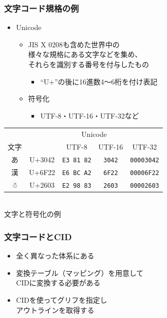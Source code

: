 \begin{frame}\frametitle{文字コード規格の例}
  \begin{itemize}
  \item Unicode
    \begin{itemize}
    \item JIS X 0208も含めた世界中の\\
      様々な規格にある文字などを集め、\\
      それらを識別する番号を付与したもの
      \begin{itemize}
      \item ``U+''の後に16進数4～6桁を付け表記
      \end{itemize}
    \item 符号化
      \begin{itemize}
        \item UTF-8・UTF-16・UTF-32など
      \end{itemize}
    \end{itemize}
  \end{itemize}

  \begin{center}
    \footnotesize
    \begin{tabular}{c|c|c|c|c}
      & \multicolumn{4}{c}{Unicode} \\
      \cline{3-5}
      文字 & & UTF-8 & UTF-16 & UTF-32 \\
      \hline
      あ & U+3042 & \texttt{E3 81 82} & \texttt{3042} & \texttt{00003042} \\
      漢 & U+6F22 & \texttt{E6 BC A2} & \texttt{6F22} & \texttt{00006F22} \\
      ☃ & U+2603 & \texttt{E2 98 83} & \texttt{2603} & \texttt{00002603}
    \end{tabular} \\
    文字と符号化の例
  \end{center}
\end{frame}

\begin{frame}\frametitle{文字コードとCID}
  \begin{itemize}
  \item 全く異なった体系にある
  \item 変換テーブル（マッピング）を用意して\\
    CIDに変換する必要がある
  \item CIDを使ってグリフを指定し　\\
    アウトラインを取得する
  \end{itemize}

  \begin{center}
    \footnotesize
    
  \end{center}
\end{frame}

